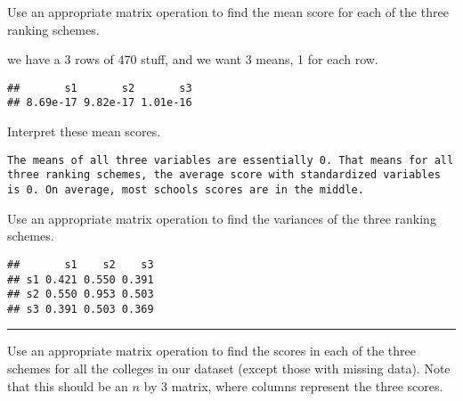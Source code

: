 \documentclass[]{article}
\newenvironment{Shaded}{\begin{snugshade}}{\end{snugshade}}
\newcommand{\KeywordTok}[1]{\textcolor[rgb]{0.13,0.29,0.53}{\textbf{#1}}}
\newcommand{\StringTok}[1]{\textcolor[rgb]{0.31,0.60,0.02}{#1}}
\newcommand{\OperatorTok}[1]{\textcolor[rgb]{0.81,0.36,0.00}{\textbf{#1}}}
\newcommand{\AlertTok}[1]{\textcolor[rgb]{0.94,0.16,0.16}{#1}}
\newcommand{\NormalTok}[1]{#1}
\begin{document}
Use an appropriate matrix operation to find the mean score for each of
the three ranking schemes.

we have a 3 rows of 470 stuff, and we want 3 means, 1 for each row.

\begin{Shaded}
\end{Shaded}

\begin{verbatim}
##       s1       s2       s3 
## 8.69e-17 9.82e-17 1.01e-16
\end{verbatim}

Interpret these mean scores.

\begin{verbatim}
The means of all three variables are essentially 0. That means for all three ranking schemes, the average score with standardized variables is 0. On average, most schools scores are in the middle.
\end{verbatim}

Use an appropriate matrix operation to find the variances of the three
ranking schemes.

\begin{Shaded}
\end{Shaded}

\begin{verbatim}
##       s1    s2    s3
## s1 0.421 0.550 0.391
## s2 0.550 0.953 0.503
## s3 0.391 0.503 0.369
\end{verbatim}

\begin{center}\rule{0.5\linewidth}{\linethickness}\end{center}

Use an appropriate matrix operation to find the scores in each of the
three schemes for all the colleges in our dataset (except those with
missing data). Note that this should be an \(n\) by 3 matrix, where
columns represent the three scores.
\end{document}
